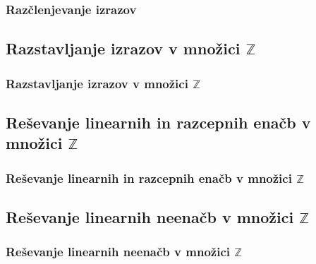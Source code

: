         \begin{frame}
            \frametitle{Razčlenjevanje izrazov}
        \end{frame}

    \subsection{Razstavljanje izrazov v množici $\mathbb{Z}$}

        \begin{frame}
            \frametitle{Razstavljanje izrazov v množici $\mathbb{Z}$}
        \end{frame}

    \subsection{Reševanje linearnih in razcepnih enačb v množici $\mathbb{Z}$}

        \begin{frame}
            \frametitle{Reševanje linearnih in razcepnih enačb v množici $\mathbb{Z}$}
        \end{frame}

    \subsection{Reševanje linearnih neenačb v množici $\mathbb{Z}$}

        \begin{frame}
            \frametitle{Reševanje linearnih neenačb v množici $\mathbb{Z}$}
        \end{frame}
